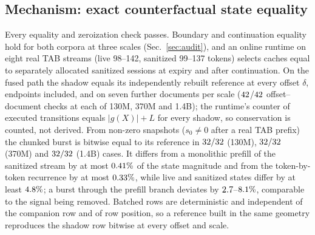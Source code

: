 \documentclass[conference]{IEEEtran}
\begin{document}
\subsection{Mechanism: exact counterfactual state equality}\label{sec:mech}
Every equality and zeroization check passes. Boundary and continuation equality hold for both corpora at three scales
(Sec.~\ref{sec:audit}), and an online runtime on eight real TAB streams (live 98--142, sanitized 99--137 tokens) selects caches equal to
separately allocated sanitized sessions at expiry and after continuation. On the fused path the shadow equals its independently
rebuilt reference at every offset $\delta$, endpoints included, and on seven further documents per scale ($42$/$42$
offset--document checks at each of 130M, 370M and 1.4B); the runtime's counter of executed transitions equals $|g(X)|{+}L$ for every
shadow, so conservation is counted, not derived. From non-zero snapshots ($s_0\neq0$ after a real TAB prefix) the chunked burst is
bitwise equal to its reference in $32/32$ (130M), $32/32$ (370M) and $32/32$ (1.4B)
cases. It differs from a monolithic prefill of the sanitized stream by at most $0.41\%$ of the state magnitude and from the
token-by-token recurrence by at most $0.33\%$, while live and sanitized states differ by at least $4.8\%$; a
burst through the prefill branch deviates by $2.7$--$8.1\%$, comparable to the signal being removed. Batched
rows are deterministic and independent of the companion row and of row position,
so a reference built in the same geometry reproduces the shadow row bitwise at every offset and scale.
\end{document}
